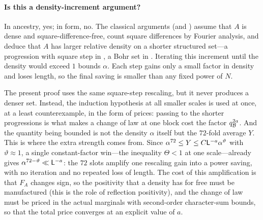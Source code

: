 \paragraph{Is this a density-increment argument?}
In ancestry, yes; in form, no. The classical arguments
\cite{PSS88,BloomMaynard} (and \cite{GreenSawhney}) assume that
$A$ is dense and square-difference-free, count square differences
by Fourier analysis, and deduce that $A$ has larger relative
density on a shorter structured set---a progression with square
step in \cite{PSS88}, a Bohr set in \cite{BloomMaynard}. Iterating
this increment until the density would exceed $1$ bounds $\alpha$.
Each step gains only a small factor in density and loses length,
so the final saving is smaller than any fixed power of $N$.

The present proof uses the same square-step rescaling, but it
never produces a denser set. Instead, the induction hypothesis at
all smaller scales is used at once, at a least counterexample, in
the form of prices: passing to the shorter progressions is what
makes a change of law at one block cost the factor
$q_{\mathcal B}^{2a}$. And the quantity being bounded is not the density
$\alpha$ itself but the $72$-fold average $Y$. This is where the
extra strength comes from. Since $\alpha^{72}\le Y\le
C\mathsf L^{-a}\alpha^{\vartheta}$ with $\vartheta\approx1$, a single
constant-factor win---the inequality $\Theta<1$ at one scale---already
gives $\alpha^{72-\vartheta}\ll\mathsf L^{-a}$: the $72$ slots amplify
one rescaling gain into a power saving, with no iteration and no
repeated loss of length. The cost of this amplification is that
$F_A$ changes sign, so the positivity that a density has for free
must be manufactured (this is the role of reflection positivity),
and the change of law must be priced in the actual marginals with
second-order character-sum bounds, so that the total price
converges at an explicit value of $a$.

